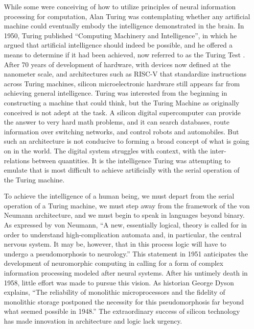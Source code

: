\documentclass[twocolumn]{article}
\begin{document}
While some were conceiving of how to utilize principles of neural information processing for computation, Alan Turing was contemplating whether any artificial machine could eventually embody the intelligence demonstrated in the brain. In 1950, Turing published ``Computing Machinery and Intelligence'', in which he argued that artificial intelligence should indeed be possible, and he offered a means to determine if it had been achieved, now referred to as the Turing Test \cite{tu1950}. After 70 years of development of hardware, with devices now defined at the nanometer scale, and architectures such as RISC-V that standardize instructions across Turing machines, silicon microelectronic hardware still appears far from achieving general intelligence. Turing was interested from the beginning in constructing a machine that could think, but the Turing Machine as originally conceived is not adept at the task. A silicon digital supercomputer can provide the answer to very hard math problems, and it can search databases, route information over switching networks, and control robots and automobiles. But such an architecture is not conducive to forming a broad concept of what is going on in the world. The digital system struggles with context, with the inter-relations between quantities. It is the intelligence Turing was attempting to emulate that is most difficult to achieve artificially with the serial operation of the Turing machine. 

To achieve the intelligence of a human being, we must depart from the serial operation of a Turing machine, we must step away from the framework of the von Neumann architecture, and we must begin to speak in languages beyond binary. As expressed by von Neumann, ``A new, essentially logical, theory is called for in order to understand high-complication automata and, in particular, the central nervous system. It may be, however, that in this process logic will have to undergo a pseudomorphosis to neurology.'' \cite{ne1951} This statement in 1951 anticipates the development of neuromorphic computing in calling for a form of complex information processing modeled after neural systems. After his untimely death in 1958, little effort was made to pursue this vision. As historian George Dyson explains, ``The reliability of monolithic microprocessors and the fidelity of monolithic storage postponed the necessity for this pseudomorphosis far beyond what seemed possible in 1948.'' \cite{dy2012} The extraordinary success of silicon technology has made innovation in architecture and logic lack urgency.
\end{document}
